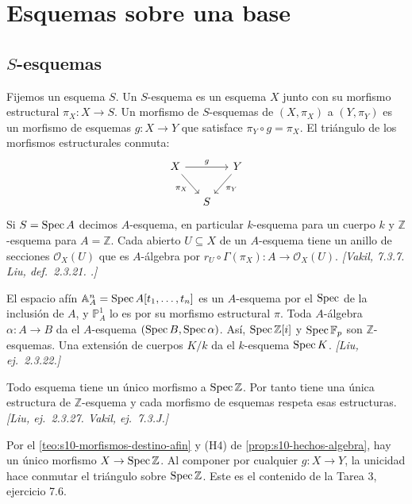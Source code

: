 \section{Esquemas sobre una base}
\label{sec:s10-esquemas-base}

\subsection{\texorpdfstring{\(S\)}{S}-esquemas}

\begin{defi}
\label{defi:s10-esquema-s}
Fijemos un esquema \(S\). Un \(S\)-esquema es un esquema \(X\) junto con su morfismo estructural \(\pi_X\colon X\to S\). Un morfismo de \(S\)-esquemas de \((X,\pi_X)\) a \((Y,\pi_Y)\) es un morfismo de esquemas \(g\colon X\to Y\) que satisface \(\pi_Y\circ g=\pi_X\). El triángulo de los morfismos estructurales conmuta:
\[
\begin{tikzcd}[column sep=small]
 X \arrow[rr,"g"] \arrow[dr,"\pi_X"'] && Y \arrow[dl,"\pi_Y"] \\
 & S &
\end{tikzcd}
\]
Si \(S=\operatorname{Spec} A\) decimos \(A\)-esquema, en particular \(k\)-esquema para un cuerpo \(k\) y \(\mathbb Z\)-esquema para \(A=\mathbb Z\). Cada abierto \(U\subseteq X\) de un \(A\)-esquema tiene un anillo de secciones \(\mathcal O_X(U)\) que es \(A\)-álgebra por \(r_U\circ\Gamma(\pi_X)\colon A\to\mathcal O_X(U)\). \emph{[Vakil, 7.3.7. Liu, def.~2.3.21. .]}
\end{defi}

\begin{ejem}
\label{ejem:s10-primeros-s-esquemas}
El espacio afín \(\mathbb A^n_A=\operatorname{Spec} A[t_1,\ldots,t_n]\) es un \(A\)-esquema por el \(\operatorname{Spec}\) de la inclusión de \(A\), y \(\mathbb P^1_A\) lo es por su morfismo estructural \(\pi\). Toda \(A\)-álgebra \(\alpha\colon A\to B\) da el \(A\)-esquema \((\operatorname{Spec} B,\operatorname{Spec}\alpha)\). Así, \(\operatorname{Spec}\mathbb Z[i]\) y \(\operatorname{Spec}\mathbb F_p\) son \(\mathbb Z\)-esquemas. Una extensión de cuerpos \(K/k\) da el \(k\)-esquema \(\operatorname{Spec} K\). \emph{[Liu, ej.~2.3.22.]}
\end{ejem}

\begin{prop}
\label{prop:s10-spec-z-final}
Todo esquema tiene un único morfismo a \(\operatorname{Spec}\mathbb Z\). Por tanto tiene una única estructura de \(\mathbb Z\)-esquema y cada morfismo de esquemas respeta esas estructuras. \emph{[Liu, ej.~2.3.27. Vakil, ej.~7.3.J.]}
\end{prop}
Por el \cref{teo:s10-morfismos-destino-afin} y (H4) de \cref{prop:s10-hechos-algebra}, hay un único morfismo \(X\to\operatorname{Spec}\mathbb Z\). Al componer por cualquier \(g\colon X\to Y\), la unicidad hace conmutar el triángulo sobre \(\operatorname{Spec}\mathbb Z\). Este es el contenido de la Tarea 3, ejercicio 7.6.

